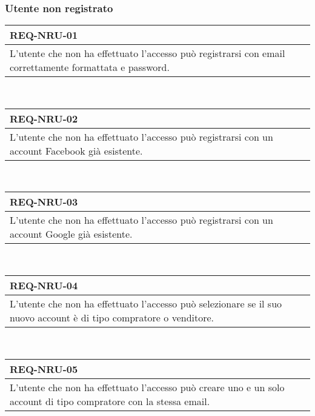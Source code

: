             \subsubsection{Utente non registrato}
                \begin{tabular}{|p{}|}
                    \hline
                    \multicolumn{1}{|l|}{\cellcolor{head}\textbf{REQ-NRU-01}} \\
                    \hline
                    L'utente che non ha effettuato l'accesso può registrarsi con email correttamente formattata e password. \\
                    \hline
                \end{tabular} \smallskip \\
                \begin{tabular}{|p{}|}
                    \hline
                    \multicolumn{1}{|l|}{\cellcolor{head}\textbf{REQ-NRU-02}} \\
                    \hline
                    L'utente che non ha effettuato l'accesso può registrarsi con un account Facebook già esistente. \\
                    \hline
                \end{tabular} \smallskip \\
                \begin{tabular}{|p{}|}
                    \hline
                    \multicolumn{1}{|l|}{\cellcolor{head}\textbf{REQ-NRU-03}} \\
                    \hline
                    L'utente che non ha effettuato l'accesso può registrarsi con un account Google già esistente. \\
                    \hline
                \end{tabular} \smallskip \\
                \begin{tabular}{|p{}|}
                    \hline
                    \multicolumn{1}{|l|}{\cellcolor{head}\textbf{REQ-NRU-04}} \\
                    \hline
                    L'utente che non ha effettuato l'accesso può selezionare se il suo nuovo account è di tipo compratore o venditore. \\
                    \hline
                \end{tabular} \smallskip \\
                \begin{tabular}{|p{}|}
                    \hline
                    \multicolumn{1}{|l|}{\cellcolor{head}\textbf{REQ-NRU-05}} \\
                    \hline
                    L'utente che non ha effettuato l'accesso può creare uno e un solo account di tipo compratore con la stessa email. \\
                    \hline
                \end{tabular} \smallskip \\
